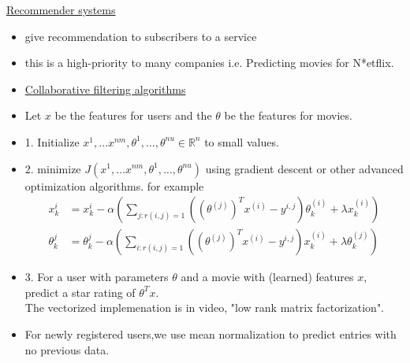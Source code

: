 \documentclass[12pt]{article}
\begin{document}
\underline{Recommender systems}
\begin{itemize}
	\item give recommendation to subscribers to a service
	\item this is a high-priority to many companies i.e. Predicting movies for N*etflix.
	\item \underline{Collaborative filtering algorithms}
	\item Let $x$ be the features for users and the $\theta$ be the features for movies.
	\item 1. Initialize $x^1, \ldots x^{nm},\theta^1,\ldots, \theta^{nu}\in \mathbb{R}^n$ to small values.
	\item 2. minimize $J(x^1, \ldots x^{nm},\theta^1,\ldots, \theta^{nu})$ using gradient descent or other advanced optimization algorithms. for example
	\begin{align*}
	x_k^i &= x_k^i - \alpha(\sum_{j:r(i,j)=1} ((\theta^{(j)})^Tx^{(i)} -y^{i,j})\theta_k^{(i)}+\lambda x_k^{(i)})\\
	\theta_k^j &= \theta_k^j - \alpha(\sum_{i:r(i,j)=1} ((\theta^{(j)})^Tx^{(i)} -y^{i,j})x_k^{(i)}+\lambda \theta_k^{(j)})
	\end{align*}
	\item 3. For a user with parameters $\theta$ and a movie with (learned) features $x$, predict a star rating of $\theta^Tx$.\\
	The vectorized implemenation is in video, "low rank matrix factorization".
	\item For newly registered users,we use mean normalization to predict entries with no previous data. 
	
\end{itemize}
\end{document}
